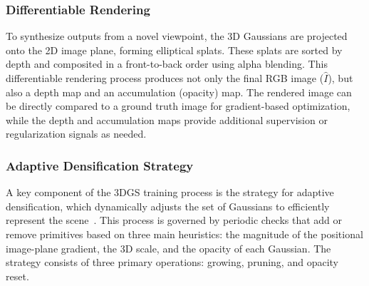 \subsubsection{Differentiable Rendering}
To synthesize outputs from a novel viewpoint, the 3D Gaussians are projected onto the 2D image plane, forming elliptical splats. These splats are sorted by depth and composited in a front-to-back order using alpha blending. This differentiable rendering process produces not only the final RGB image ($\hat{I}$), but also a depth map and an accumulation (opacity) map. The rendered image can be directly compared to a ground truth image for gradient-based optimization, while the depth and accumulation maps provide additional supervision or regularization signals as needed.

\subsubsection{Adaptive Densification Strategy}
A key component of the 3DGS training process is the strategy for adaptive densification, which dynamically adjusts the set of Gaussians to efficiently represent the scene~\cite{kerbl_3d_2023}. This process is governed by periodic checks that add or remove primitives based on three main heuristics: the magnitude of the positional image-plane gradient, the 3D scale, and the opacity of each Gaussian. The strategy consists of three primary operations: growing, pruning, and opacity reset.

